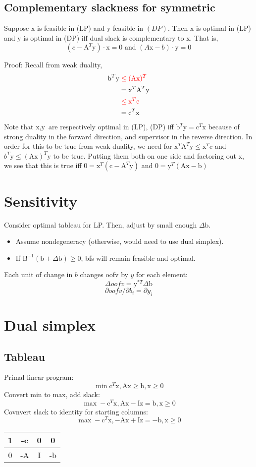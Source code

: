 \documentclass[6pt]{article}
\def\x{\textrm{x}}
\def\y{\textrm{y}}
\def\z{\textrm{z}}
\def\c{\textrm{c}}
\def\b{\textrm{b}}
\def\A{\textrm{A}}
\def\B{\textrm{B}}
\def\I{\textrm{I}}
\begin{document}
\subsection{Complementary slackness for symmetric}
Suppose $\x$ is feasible in (LP) and $\y$ feasible in $(DP)$. Then $\x$ is optimal in (LP) and $\y$ is optimal in (DP) iff dual slack is complementary to x. That is,
$$(c-\A^T\y)\cdot \x = 0 \textrm{ and }(A\x-b)\cdot\y=0$$

Proof: Recall from weak duality,
\begin{align*}
    \b^T\y & \color{red}\leq  (\A\x)^T\\
    &= \x^T\A^T\y\\
    &\color{red} \leq \x^T\c\\
    &= \c^T\x
\end{align*}
Note that $\x,\y$ are respectively optimal in (LP), (DP) iff $\b^T\y = \c^T\x$ because of strong duality in the forward direction, and supervisor in the reverse direction. In order for this to be true from weak duality, we need for $\x^T\A^T\y \leq \x^T\c$ and $b^T\y \leq (\A\x)^T\y$ to be true. Putting them both on one side and factoring out $\x$, we see that this is true iff $0 = \x^T(\c-\A^T\y)$ and $0=\y^T(\A\x - \b)$


\section{Sensitivity}
Consider optimal tableau for LP. Then, adjust by small enough $\Delta \b$.
\begin{itemize}
    \item Assume nondegeneracy (otherwise, would need to use dual simplex).
    \item If $\B^{-1}(\b+\Delta \b) \geq 0$, bfs will remain feasible and optimal.
\end{itemize}{}
    Each unit of change in $b$ changes oofv by $y$ for each element: $$\Delta oofv = \y^{*T}\Delta\b$$
    $$\partial oofv / \partial b_i = \partial y_i$$

\section{Dual simplex}
\subsection{Tableau}
Primal linear program:
$$\min \c^T\x, \A\x\geq \b, \x\geq 0$$
Convert min to max, add slack:
$$\max -\c^T\x, \A\x-\I\z=\b, \x\geq 0$$
Covnvert slack to identity for starting columns:
$$\max -\c^T\x, -\A\x+\I\z=-\b, \x\geq 0$$
\begin{tabular}{c|cc|c}
    1 & -c & 0 & 0 \\
    \hline
    0 & -A & I & -b
\end{tabular}
\end{document}
